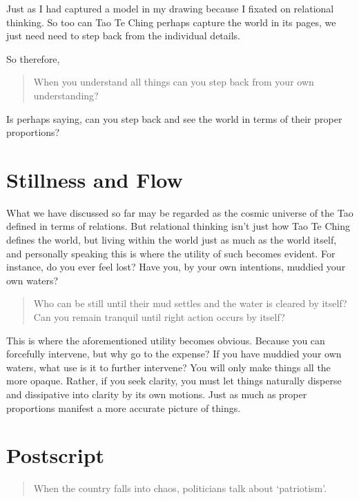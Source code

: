 Just as I had captured a model in my drawing because I fixated on relational thinking. So too can Tao Te Ching perhaps capture the world in its pages, we just need need to step back from the individual details. 

So therefore, 
\begin{verse}
When you understand all things can you step back from your own understanding?\\
\end{verse}
Is perhaps saying, can you step back and see the world in terms of their proper proportions? 


\section{Stillness and Flow}

What we have discussed so far may be regarded as the cosmic universe of the Tao defined in terms of relations. But relational thinking isn’t just how Tao Te Ching defines the world, but living within the world just as much as the world itself, and personally speaking this is where the utility of such becomes evident. For instance, do you ever feel lost? Have you, by your own intentions, muddied your own waters?

\begin{verse}
Who can be still until their mud settles and the water is cleared by itself?\\
Can you remain tranquil until right action occurs by itself?\\
\end{verse}

This is where the aforementioned utility becomes obvious. Because you can forcefully intervene, but why go to the expense? If you have muddied your own waters, what use is it to further intervene? You will only make things all the more opaque. Rather, if you seek clarity, you must let things naturally disperse and dissipative into clarity by its own motions. Just as much as proper proportions manifest a more accurate picture of things. 

\section{Postscript}


\begin{verse}
When the country falls into chaos, politicians talk about `patriotism'.\\
\end{verse}

